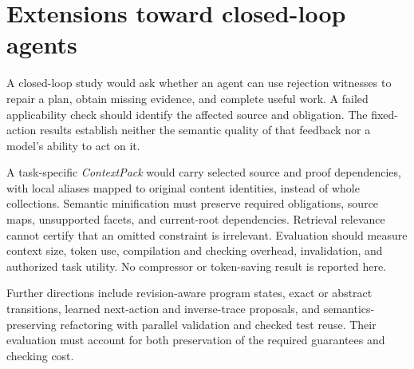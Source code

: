 \section{Extensions toward closed-loop agents}
\label{sec:extensions}

A closed-loop study would ask whether an agent can use rejection witnesses to repair a plan, obtain missing evidence, and complete useful work. A failed applicability check should identify the affected source and obligation. The fixed-action results establish neither the semantic quality of that feedback nor a model's ability to act on it.

A task-specific \emph{ContextPack} would carry selected source and proof dependencies, with local aliases mapped to original content identities, instead of whole collections. Semantic minification must preserve required obligations, source maps, unsupported facets, and current-root dependencies. Retrieval relevance cannot certify that an omitted constraint is irrelevant. Evaluation should measure context size, token use, compilation and checking overhead, invalidation, and authorized task utility. No compressor or token-saving result is reported here.

Further directions include revision-aware program states, exact or abstract transitions, learned next-action and inverse-trace proposals, and semantics-preserving refactoring with parallel validation and checked test reuse. Their evaluation must account for both preservation of the required guarantees and checking cost.
